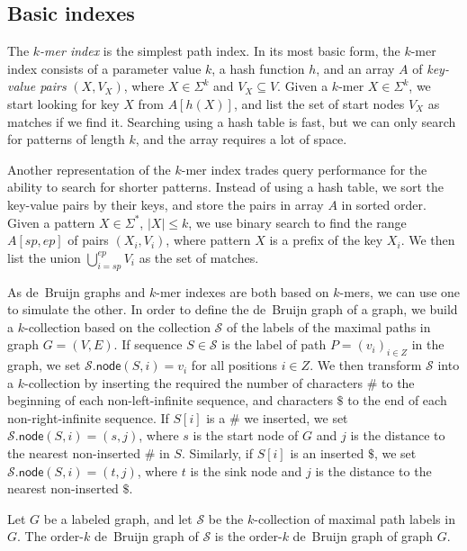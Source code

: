 \documentclass[a4paper,UKenglish]{lipics-v2016}
\newcommand{\abs}[1]{\ensuremath{\lvert #1 \rvert}}
\newcommand{\gnode}{\ensuremath{\mathsf{node}}}
\newcommand{\kmer}[1]{$#1$\nobreakdash-mer}
\newcommand{\kcollection}[1]{$#1$\nobreakdash-collection}
\newcommand{\orderk}[1]{order\nobreakdash-$#1$}
\begin{document}
\subsection{Basic indexes}

The \emph{\kmer{k} index} is the simplest path index. In its most basic form, the \kmer{k} index consists of a parameter value $k$, a hash function $h$, and an array $A$ of \emph{key-value pairs} $(X, V_{X})$, where $X \in \Sigma^{k}$ and $V_{X} \subseteq V$. Given a \kmer{k} $X \in \Sigma^{k}$, we start looking for key $X$ from $A[h(X)]$, and list the set of start nodes $V_{X}$ as matches if we find it. Searching using a hash table is fast, but we can only search for patterns of length $k$, and the array requires a lot of space.

Another representation of the \kmer{k} index trades query performance for the ability to search for shorter patterns. Instead of using a hash table, we sort the key-value pairs by their keys, and store the pairs in array $A$ in sorted order. Given a pattern $X \in \Sigma^{\ast}$, $\abs{X} \le k$, we use binary search to find the range $A[sp, ep]$ of pairs $(X_{i}, V_{i})$, where pattern $X$ is a prefix of the key $X_{i}$. We then list the union $\bigcup_{i=sp}^{ep} V_{i}$ as the set of matches.

As de~Bruijn graphs and \kmer{k} indexes are both based on \kmer{k}s, we can use one to simulate the other. In order to define the de~Bruijn graph of a graph, we build a \kcollection{k} based on the collection $\mathcal{S}$ of the labels of the maximal paths in graph $G = (V, E)$. If sequence $S \in \mathcal{S}$ is the label of path $P = (v_{i})_{i \in Z}$ in the graph, we set $\mathcal{S}.\gnode(S, i) = v_{i}$ for all positions $i \in Z$. We then transform $\mathcal{S}$ into a \kcollection{k} by inserting the required the number of characters $\#$ to the beginning of each non-left-infinite sequence, and characters $\$$ to the end of each non-right-infinite sequence. If $S[i]$ is a $\#$ we inserted, we set $\mathcal{S}.\gnode(S, i) = (s, j)$, where $s$ is the start node of $G$ and $j$ is the distance to the nearest non-inserted $\#$ in $S$. Similarly, if $S[i]$ is an inserted $\$$, we set $\mathcal{S}.\gnode(S, i) = (t, j)$, where $t$ is the sink node and $j$ is the distance to the nearest non-inserted $\$$.

\begin{definition}
Let $G$ be a labeled graph, and let $\mathcal{S}$ be the \kcollection{k} of maximal path labels in $G$. The \orderk{k} de~Bruijn graph of $\mathcal{S}$ is the \orderk{k} de~Bruijn graph of graph $G$.
\end{definition}
\end{document}
